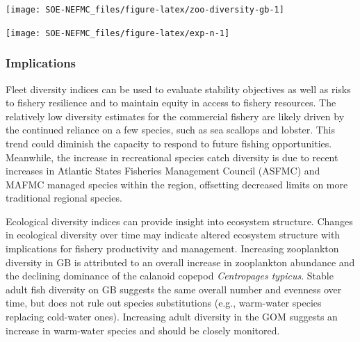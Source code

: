 \documentclass[
  10pt,
]{article}
\let\origfigure\figure
\let\endorigfigure\endfigure
\renewenvironment{figure}[1][2] {
    \expandafter\origfigure\expandafter[H]
} {
    \endorigfigure
}
\begin{document}
\begin{figure}

{\centering \texttt{[image: SOE-NEFMC\_files/figure-latex/zoo-diversity-gb-1]} 

}

\caption{Zooplankton diversity on Georges Bank and in the Gulf of Maine, based on Shannon diversity index. 2020 surveys were incomplete due to COVID-19.}\label{fig:zoo-diversity-gb}
\end{figure}
\begin{figure}

{\centering \texttt{[image: SOE-NEFMC\_files/figure-latex/exp-n-1]} 

}

\caption{Adult fish diversity for Georges Bank and in the Gulf of Maine, based on expected number of species. Results from survey vessels Albatross and Bigelow are reported separately due to catchability differences.}\label{fig:exp-n}
\end{figure}

\hypertarget{implications-3}{%
\subsubsection{Implications}\label{implications-3}}

Fleet diversity indices can be used to evaluate stability objectives as well as risks to fishery resilience and to maintain equity in access to fishery resources. The relatively low diversity estimates for the commercial fishery are likely driven by the continued reliance on a few species, such as sea scallops and lobster. This trend could diminish the capacity to respond to future fishing opportunities. Meanwhile, the increase in recreational species catch diversity is due to recent increases in Atlantic States Fisheries Management Council (ASFMC) and MAFMC managed species within the region, offsetting decreased limits on more traditional regional species.

Ecological diversity indices can provide insight into ecosystem structure. Changes in ecological diversity over time may indicate altered ecosystem structure with implications for fishery productivity and management. Increasing zooplankton diversity in GB is attributed to an overall increase in zooplankton abundance and the declining dominance of the calanoid copepod \emph{Centropages typicus}. Stable adult fish diversity on GB suggests the same overall number and evenness over time, but does not rule out species substitutions (e.g., warm-water species replacing cold-water ones). Increasing adult diversity in the GOM suggests an increase in warm-water species and should be closely monitored.
\end{document}
